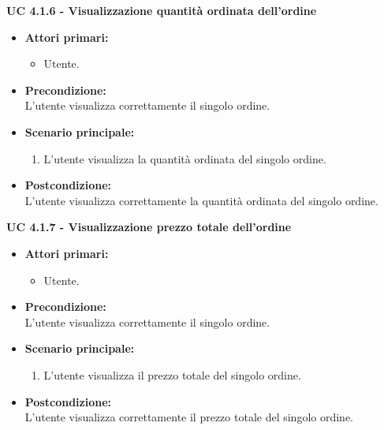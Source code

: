 \vspace{0.5cm}

\noindent \textbf{\large UC 4.1.6 - Visualizzazione quantità ordinata dell'ordine}
\label{uc:visualizzazione-quantità-ordinata}
\begin{itemize}

	\item \textbf{Attori primari: }
		\begin{itemize}
			\item Utente.
		\end{itemize}

	\item \textbf{Precondizione: }\\[0.3cm]
		L'utente visualizza correttamente il singolo ordine.

	\item \textbf{Scenario principale: }
		\begin{enumerate}
			\item L'utente visualizza la quantità ordinata del singolo ordine.
		\end{enumerate}
		

	\item \textbf{Postcondizione: }\\[0.3cm]
		L'utente visualizza correttamente la quantità ordinata del singolo ordine.

\end{itemize}

\vspace{0.5cm}

\noindent \textbf{\large UC 4.1.7 - Visualizzazione prezzo totale dell'ordine}
\label{uc:visualizzazione-prezzo-totale-ord}
\begin{itemize}

	\item \textbf{Attori primari: }
		\begin{itemize}
			\item Utente.
		\end{itemize}

	\item \textbf{Precondizione: }\\[0.3cm]
		L'utente visualizza correttamente il singolo ordine.

	\item \textbf{Scenario principale: }
		\begin{enumerate}
			\item L'utente visualizza il prezzo totale del singolo ordine.
		\end{enumerate}
		

	\item \textbf{Postcondizione: }\\[0.3cm]
		L'utente visualizza correttamente il prezzo totale del singolo ordine.

\end{itemize}

